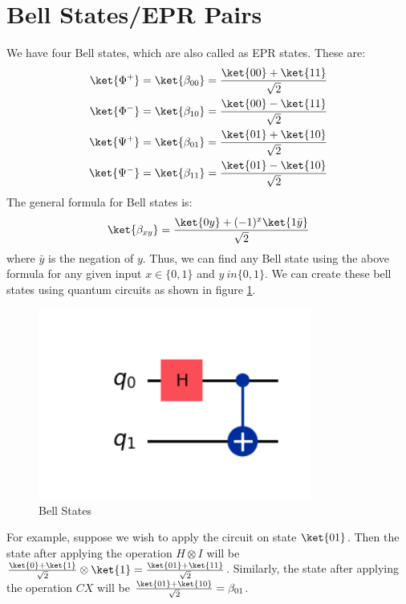 \documentclass[12pt, oneside]{book}
\theoremstyle{definition}
\theoremstyle{definition}
\theoremstyle{remark}
\begin{document}
\section{Bell States/EPR Pairs}
We have four Bell states, which are also called as EPR states. These are:
\begin{align*}
    \ket{\Phi^+}&=\ket{\beta_{00}}=\frac{\ket{00}+\ket{11}}{\sqrt{2}} \\
    \ket{\Phi^-}&=\ket{\beta_{10}}=\frac{\ket{00}-\ket{11}}{\sqrt{2}} \\
    \ket{\Psi^+}&=\ket{\beta_{01}}=\frac{\ket{01}+\ket{10}}{\sqrt{2}} \\
    \ket{\Psi^-}&=\ket{\beta_{11}}=\frac{\ket{01}-\ket{10}}{\sqrt{2}} \\
\end{align*}
The general formula for Bell states is:
\[
    \ket{\beta_{xy}}=\frac{\ket{0y}+(-1)^x\ket{1\bar{y}}}{\sqrt{2}}
\]
where $\bar{y}$ is the negation of $y$. Thus, we can find any Bell state using the above formula for 
any given input $x \in \{0,1\}$ and $y\ in \{0,1\}$.
We can create these bell states using quantum circuits as shown in figure \ref{fig:bell-states}.
\begin{figure}[H]
    \centering
    \includegraphics[width=0.8\textwidth]{../images/bell-states.png}
    \caption{Bell States}
    \label{fig:bell-states}
\end{figure}
For example, suppose we wish to apply the circuit on state $\ket{01}$. Then the state after applying the
operation $H \otimes I$ will be $\frac{\ket{0}+\ket{1}}{\sqrt{2}}\otimes\ket{1}=\frac{\ket{01}+\ket{11}}{\sqrt{2}}$.
Similarly, the state after applying the operation $CX$ will be $\frac{\ket{01}+\ket{10}}{\sqrt{2}}=\beta_{01}$.
\end{document}

